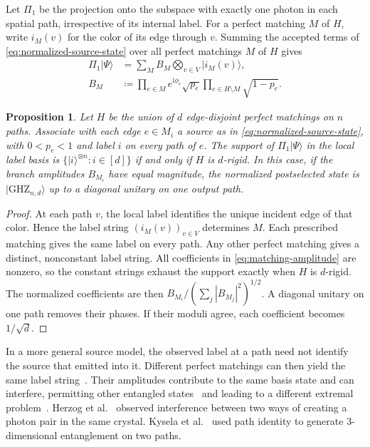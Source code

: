 \documentclass[10pt]{article}
\numberwithin{equation}{section}
\newtheorem{proposition}[proposition]{Proposition}
\theoremstyle{definition}
\begin{document}
Let $\Pi_1$ be the projection onto the subspace with exactly one photon in each spatial path, irrespective of its internal label. For a perfect matching $M$ of $H$, write $i_M(v)$ for the color of its edge through $v$. Summing the accepted terms of \cref{eq:normalized-source-state} over all perfect matchings $M$ of $H$ gives
\begin{align}
 \Pi_1|\Psi\rangle
 &=\sum_M B_M\bigotimes_{v\in V}|i_M(v)\rangle,\label{eq:matching-state}\\
 B_M&\coloneqq\prod_{e\in M}e^{\mathrm{i}\phi_e}\sqrt{p_e}\prod_{e\in H\setminus M}\sqrt{1-p_e}.\label{eq:matching-amplitude}
\end{align}
\begin{samepage}
\begin{proposition}\label{prop:source-rigidity}
Let $H$ be the union of $d$ edge-disjoint perfect matchings on $n$ paths. Associate with each edge $e\in M_i$ a source as in \cref{eq:normalized-source-state}, with $0<p_e<1$ and label $i$ on every path of $e$. The support of $\Pi_1|\Psi\rangle$ in the local label basis is $\{|i\rangle^{\otimes n}\colon i\in[d]\}$ if and only if $H$ is $d$-rigid. In this case, if the branch amplitudes $B_{M_i}$ have equal magnitude, the normalized postselected state is $|\mathrm{GHZ}_{n,d}\rangle$ up to a diagonal unitary on one output path.
\end{proposition}
\end{samepage}
\begin{proof}
At each path $v$, the local label identifies the unique incident edge of that color. Hence the label string $(i_M(v))_{v\in V}$ determines $M$. Each prescribed matching gives the same label on every path. Any other perfect matching gives a distinct, nonconstant label string. All coefficients in \cref{eq:matching-amplitude} are nonzero, so the constant strings exhaust the support exactly when $H$ is $d$-rigid. The normalized coefficients are then $B_{M_i}/(\sum_j|B_{M_j}|^2)^{1/2}$. A diagonal unitary on one path removes their phases. If their moduli agree, each coefficient becomes $1/\sqrt d$.
\end{proof}

In a more general source model, the observed label at a path need not identify the source that emitted into it. Different perfect matchings can then yield the same label string~\cite{KrennGuSoltesz2019,GuErhardZeilingerKrenn2019}. Their amplitudes contribute to the same basis state and can interfere, permitting other entangled states~\cite{GuChenZeilingerKrenn2019} and leading to a different extremal problem~\cite{ChandranGajjala2024}. Herzog et al.~\cite{HerzogEtAl1994} observed interference between two ways of creating a photon pair in the same crystal. Kysela et al.~\cite{KyselaEtAl2020} used path identity to generate 3-dimensional entanglement on two paths.
\end{document}
